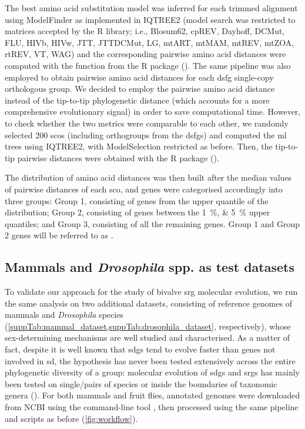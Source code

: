 The best amino acid substitution model was inferred for each trimmed alignment using ModelFinder as implemented in IQTREE2 (model search was restricted to matrices accepted by the  R library; i.e., Blosum62, cpREV, Dayhoff, DCMut, FLU, HIVb, HIVw, JTT, JTTDCMut, LG, mtART, mtMAM, mtREV, mtZOA, rtREV, VT, WAG) and the corresponding pairwise amino acid distances were computed with the function  from the  R package (). The same pipeline was also employed to obtain pairwise amino acid distances for each \gls{dsfg} single-copy orthologous group. We decided to employ the pairwise amino acid distance instead of the tip-to-tip phylogenetic distance (which accounts for a more comprehensive evolutionary signal) in order to save computational time. However, to check whether the two metrics were comparable to each other, we randomly selected 200 \glspl{sco} (including orthogroups from the \glspl{dsfg}) and computed the \gls{ml} trees using IQTREE2, with ModelSelection restricted as before. Then, the tip-to-tip pairwise distances were obtained with the R package  ().

The distribution of amino acid distances was then built after the median values of pairwise distances of each \gls{sco}, and genes were categorised accordingly into three groups: Group 1, consisting of genes from the \onepercent{} upper quantile of the distribution; Group 2, consisting of genes between the \qtylist{1;5}{\percent} upper quantiles; and Group 3, consisting of all the remaining genes. Group 1 and Group 2 genes will be referred to as .

\subsection{Mammals and \textit{Drosophila} spp. as test datasets}
To validate our approach for the study of bivalve \gls{srg} molecular evolution, we run the same analysis on two additional datasets, consisting of reference genomes of mammals and \textit{Drosophila} species (\cref{suppTab:mammal_dataset,suppTab:drosophila_dataset}, respectively), whose sex-determining mechanisms are well studied and characterised. As a matter of fact, despite it is well known that \glspl{sdg} tend to evolve faster than genes not involved in \gls{sd}, the hypothesis has never been tested extensively across the entire phylogenetic diversity of a group: molecular evolution of \glspl{sdg} and \glspl{srg} has mainly been tested on single/pairs of species or inside the boundaries of taxonomic genera (). For both mammals and fruit flies, annotated genomes were downloaded from NCBI using the command-line tool , then processed using the same pipeline and scripts as before (\cref{fig:workflow}).

